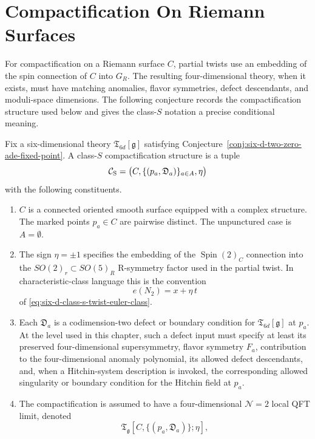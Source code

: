 \section{Compactification On Riemann Surfaces}
\label{sec:six-d-class-s-compactification-data}

For compactification on a Riemann surface \(C\), partial twists use an
embedding of the spin connection of \(C\) into \(G_R\).  The resulting
four-dimensional theory, when it exists, must have matching anomalies, flavor
symmetries, defect descendants, and moduli-space dimensions.  The following
conjecture records the compactification structure used below and gives the
class-\(S\) notation a precise conditional meaning.

\begin{conjecture}
\label{conj:class-s-compactification-qft}
Fix a six-dimensional theory
\(\mathfrak T_{6d}[\mathfrak g]\) satisfying
Conjecture~\ref{conj:six-d-two-zero-ade-fixed-point}.  A class-\(S\)
compactification structure is a tuple
\[
  \mathcal C_{\rm S}
  =
  \bigl(C,\{(p_a,\mathfrak D_a)\}_{a\in A},\eta\bigr)
\]
with the following constituents.
\begin{enumerate}[label=\textup{(\roman*)}]
\item \(C\) is a connected oriented smooth surface equipped with a complex
structure.  The marked points \(p_a\in C\) are pairwise distinct.  The
unpunctured case is \(A=\emptyset\).
\item The sign \(\eta=\pm1\) specifies the embedding of the
\(\operatorname{Spin}(2)_C\) connection into the \(SO(2)_r\subset SO(5)_R\)
R-symmetry factor used in the partial twist.  In characteristic-class
language this is the convention
\[
  e(N_2)=x+\eta\,t
\]
of \eqref{eq:six-d-class-s-twist-euler-class}.
\item Each \(\mathfrak D_a\) is a codimension-two defect or boundary
condition for \(\mathfrak T_{6d}[\mathfrak g]\) at \(p_a\).  At the level
used in this chapter, such a defect input must specify at least its preserved
four-dimensional supersymmetry, flavor symmetry \(F_a\), contribution to the
four-dimensional anomaly polynomial, its allowed defect descendants, and,
when a Hitchin-system description is invoked, the corresponding allowed
singularity or boundary condition for the Hitchin field at \(p_a\).
\item The compactification is assumed to have a four-dimensional
\(\mathcal N=2\) local QFT limit, denoted
\[
  \mathfrak T_{\mathfrak g}[C,\{(p_a,\mathfrak D_a)\};\eta],
\]
\end{enumerate}
\end{conjecture}
